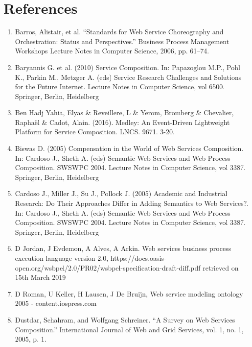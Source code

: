 \documentclass{article}
\begin{document}
\section{References}
\begin{enumerate}
\item Barros, Alistair, et al. “Standards for Web Service Choreography and Orchestration: Status and Perspectives.” Business Process Management Workshops Lecture Notes in Computer Science, 2006, pp. 61–74.

\item Baryannis G. et al. (2010) Service Composition. In: Papazoglou M.P., Pohl K., Parkin M., Metzger A. (eds) Service Research Challenges and Solutions for the Future Internet. Lecture Notes in Computer Science, vol 6500. Springer, Berlin, Heidelberg

\item Ben Hadj Yahia, Elyas \& Reveillere, L \& Yerom, Bromberg \& Chevalier, Raphaël \& Cadot, Alain. (2016). Medley: An Event-Driven Lightweight Platform for Service Composition. LNCS. 9671. 3-20.

\item Biswas D. (2005) Compensation in the World of Web Services Composition. In: Cardoso J., Sheth A. (eds) Semantic Web Services and Web Process Composition. SWSWPC 2004. Lecture Notes in Computer Science, vol 3387. Springer, Berlin, Heidelberg

\item Cardoso J., Miller J., Su J., Pollock J. (2005) Academic and Industrial Research: Do Their Approaches Differ in Adding Semantics to Web Services?. In: Cardoso J., Sheth A. (eds) Semantic Web Services and Web Process Composition. SWSWPC 2004. Lecture Notes in Computer Science, vol 3387. Springer, Berlin, Heidelberg

\item D Jordan, J Evdemon, A Alves, A Arkin. Web services business process execution language version 2.0, https://docs.oasis-open.org/wsbpel/2.0/PR02/wsbpel-specification-draft-diff.pdf  retrieved on 15th March 2019

\item D Roman, U Keller, H Lausen, J De Bruijn, Web service modeling ontology
2005 - content.iospress.com

\item Dustdar, Schahram, and Wolfgang Schreiner. “A Survey on Web Services Composition.” International Journal of Web and Grid Services, vol. 1, no. 1, 2005, p. 1.


\end{enumerate}
\end{document}
